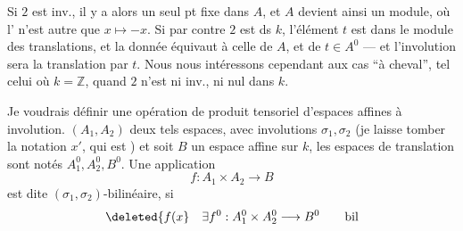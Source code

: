 Si $2$ est inv., il y a alors un seul pt fixe dans $A$, et $A$ devient ainsi un module, où l' n'est autre que $x\mapsto-x$. Si par contre $2$ est   ds $k$,  l'élément $t$ est dans le module des translations, et la donnée équivaut à celle de $A$, et de $t\in A^0$ --- et l'involution sera la translation par $t$. Nous nous intéressons cependant aux cas ``à cheval'', tel celui où $k=\mathbb Z$, quand $2$ n'est ni inv., ni nul dans $k$. 

Je voudrais définir une opération de produit tensoriel d'espaces affines à involution.  $(A_1,A_2)$ deux tels espaces, avec involutions $\sigma_1,\sigma_2$ (je laisse tomber la notation $x'$, qui est  ) et soit $B$ un espace affine sur $k$, les espaces de translation sont notés $A_1^0,A_2^0,B^0$.
Une application
\[
 f:A_1\times A_2\longrightarrow B
\]
est dite  $(\sigma_1,\sigma_2)$-bilinéaire, si \deleted{$\unsure{\exists!|\exists}$}
\[
 \deleted{f(x}\quad\exists f^0:A_1^0\times A_2^0\longrightarrow B^0\qquad\text{bil}
\]

